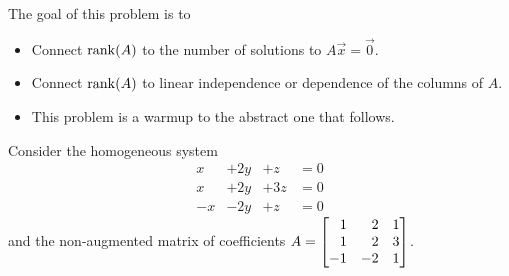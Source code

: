 	\bookonlynewpage
	\question
	\begin{annotation}
		\begin{goals}

			The goal of this problem is to
			\begin{itemize}
				\item Connect $\operatorname{rank}(A)$ to the number of solutions to $A\vec x=\vec 0$.
				\item Connect $\operatorname{rank}(A)$ to linear independence or dependence of the columns of $A$.
			\end{itemize}
		\end{goals}

		\begin{notes}
			\begin{itemize}
				\item This problem is a warmup to the abstract one that follows.
			\end{itemize}
		\end{notes}
	\end{annotation}
	Consider the homogeneous system
		\begin{equation}\label{eq4bx}
			\begin{array}{llll}
				x&+2y&+z &= 0\\
				x&+2y&+3z &= 0\\
				-x&-2y&+z &= 0
			\end{array}
		\end{equation}
	and the non-augmented matrix of coefficients $A=\mat{1&2&1\\1&2&3\\-1&-2&1}$.

